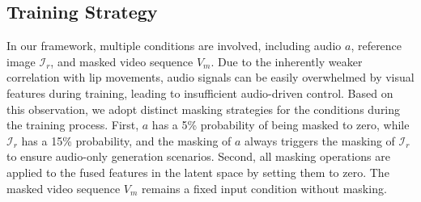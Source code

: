 \subsection{Training Strategy}

In our framework, multiple conditions are involved, including audio $a$, reference image $\mathcal{I}_r$, and masked video sequence $V_m$. Due to the inherently weaker correlation with lip movements, audio signals can be easily overwhelmed by visual features during training, leading to insufficient audio-driven control. Based on this observation, we adopt distinct masking strategies for the conditions during the training process. First, $a$ has a 5\% probability of being masked to zero, while $\mathcal{I}_r$ has a 15\% probability, and the masking of $a$ always triggers the masking of $\mathcal{I}_r$ to ensure audio-only generation scenarios. Second, all masking operations are applied to the fused features in the latent space by setting them to zero. The masked video sequence $V_m$ remains a fixed input condition without masking.

